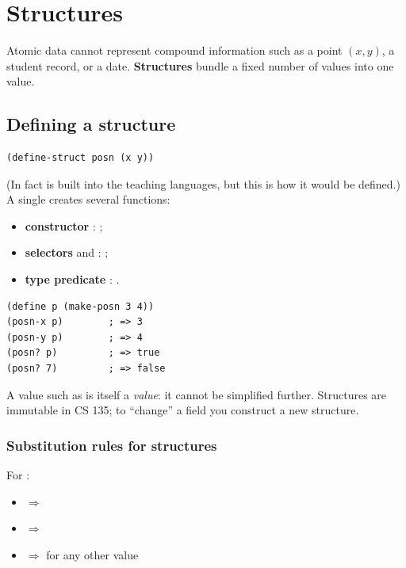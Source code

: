 \chapter{Structures}

Atomic data cannot represent compound information such as a point $(x,y)$, a
student record, or a date. \textbf{Structures} bundle a fixed number of values
into one value.

\section{Defining a structure}

\begin{lstlisting}[style=racket]
(define-struct posn (x y))
\end{lstlisting}
(In fact  is built into the teaching languages, but this is how it
would be defined.) A single  creates several functions:
\begin{itemize}
  \item \textbf{constructor} : ;
  \item \textbf{selectors}  and : ;
  \item \textbf{type predicate} : .
\end{itemize}

\begin{lstlisting}[style=racket]
(define p (make-posn 3 4))
(posn-x p)        ; => 3
(posn-y p)        ; => 4
(posn? p)         ; => true
(posn? 7)         ; => false
\end{lstlisting}

A value such as  is itself a \emph{value}: it cannot be
simplified further. Structures are immutable in CS 135; to ``change'' a field
you construct a new structure.

\subsection{Substitution rules for structures}
\begin{important}
For :
\begin{itemize}
  \item {} $\Rightarrow$ 
  \item {} $\Rightarrow$ 
  \item {} $\Rightarrow$  for any other value 
\end{itemize}
\end{important}

